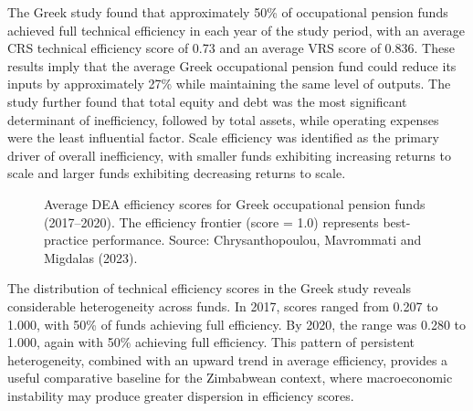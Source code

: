 \documentclass[12pt,a4paper]{article}
\begin{document}
The Greek study found that approximately 50\% of occupational pension funds achieved full technical efficiency in each year of the study period, with an average CRS technical efficiency score of 0.73 and an average VRS score of 0.836. These results imply that the average Greek occupational pension fund could reduce its inputs by approximately 27\% while maintaining the same level of outputs. The study further found that total equity and debt was the most significant determinant of inefficiency, followed by total assets, while operating expenses were the least influential factor. Scale efficiency was identified as the primary driver of overall inefficiency, with smaller funds exhibiting increasing returns to scale and larger funds exhibiting decreasing returns to scale.

\begin{figure}[H]
\centering
{}
\caption{Average DEA efficiency scores for Greek occupational pension funds (2017--2020). The efficiency frontier (score = 1.0) represents best-practice performance. Source: Chrysanthopoulou, Mavrommati and Migdalas (2023).}
\label{fig:greek_efficiency}
\end{figure}

The distribution of technical efficiency scores in the Greek study reveals considerable heterogeneity across funds. In 2017, scores ranged from 0.207 to 1.000, with 50\% of funds achieving full efficiency. By 2020, the range was 0.280 to 1.000, again with 50\% achieving full efficiency. This pattern of persistent heterogeneity, combined with an upward trend in average efficiency, provides a useful comparative baseline for the Zimbabwean context, where macroeconomic instability may produce greater dispersion in efficiency scores.
\end{document}
